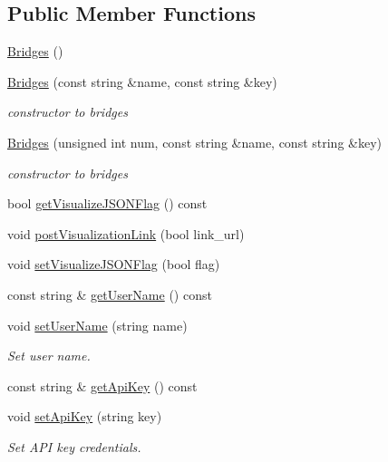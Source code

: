 \subsection*{Public Member Functions}
\begin{DoxyCompactItemize}
\item 
\hyperlink{classbridges_1_1_bridges_aab8b250b2b5ba0034ceb2494fe5ea437}{Bridges} ()
\item 
\hyperlink{classbridges_1_1_bridges_a21d9e98cb1f3994300079b489f14e71e}{Bridges} (const string \&name, const string \&key)
\begin{DoxyCompactList}\small\item\em constructor to bridges \end{DoxyCompactList}\item 
\hyperlink{classbridges_1_1_bridges_aa58a928530695a5d0e9bf15fa09c8d84}{Bridges} (unsigned int num, const string \&name, const string \&key)
\begin{DoxyCompactList}\small\item\em constructor to bridges \end{DoxyCompactList}\item 
bool \hyperlink{classbridges_1_1_bridges_a6c2897b19a25989e09c031152a74317d}{get\+Visualize\+J\+S\+O\+N\+Flag} () const
\item 
void \hyperlink{classbridges_1_1_bridges_a87689558283f73f0d88979c2ae575054}{post\+Visualization\+Link} (bool link\+\_\+url)
\item 
void \hyperlink{classbridges_1_1_bridges_a69aca37ab2729d0345e0549d7baf0423}{set\+Visualize\+J\+S\+O\+N\+Flag} (bool flag)
\item 
const string \& \hyperlink{classbridges_1_1_bridges_ad16be2d94936fd555bc05f58c8c21f50}{get\+User\+Name} () const
\item 
void \hyperlink{classbridges_1_1_bridges_a383c5c1d3c85541f466e0cb60dde1c29}{set\+User\+Name} (string name)
\begin{DoxyCompactList}\small\item\em Set user name. \end{DoxyCompactList}\item 
const string \& \hyperlink{classbridges_1_1_bridges_a9a44f38d883859ef19c94ce17eec43b5}{get\+Api\+Key} () const
\item 
void \hyperlink{classbridges_1_1_bridges_a589e77031841f06a2f32d5b29e25d4af}{set\+Api\+Key} (string key)
\begin{DoxyCompactList}\small\item\em Set A\+PI key credentials. \end{DoxyCompactList}\item 

\end{DoxyCompactItemize}

